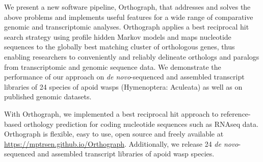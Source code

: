 We present a new software pipeline, Orthograph, that addresses and
solves the above problems and implements useful features for a wide
range of comparative genomic and transcriptomic analyses.  Orthograph
applies a best reciprocal hit search strategy using profile hidden
Markov models and maps nucleotide sequences to the globally best
matching cluster of orthologous genes, thus enabling researchers to
conveniently and reliably delineate orthologs and paralogs from
transcriptomic and genomic sequence data. We demonstrate the performance
of our approach on \emph{de novo}-sequenced and assembled transcript
libraries of 24 species of apoid wasps (Hymenoptera: Aculeata) as well
as on published genomic datasets.

With Orthograph, we implemented a best reciprocal hit approach to
reference-based orthology prediction for coding nucleotide sequences
such as RNAseq data. Orthograph is flexible, easy to use, open source
and freely available at \url{https://mptrsen.github.io/Orthograph}.
Additionally, we release 24 \emph{de novo}-sequenced and assembled
transcript libraries of apoid wasp species.
